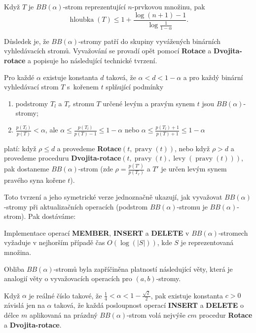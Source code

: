 \documentclass[a4paper,12pt]{article}
\DeclareMathOperator*{\levy}{levy}
\DeclareMathOperator*{\pravy}{pravy}
\DeclareMathOperator*{\hloubka}{hloubka}
\begin{document}
\begin{tvrzeni}Když $T$ je $BB(\alpha )$-strom reprezentující 
$n$-prvkovou množinu, pak 
$$\hloubka(T)\le 1+\frac {\log(n+1)-1}{\log\frac 1{1-\alpha}}.$$
\end{tvrzeni}

Důsledek je, že $BB(\alpha )$-stromy patří do 
skupiny vyvážených binárních vyhledávacích 
stro\-mů.  Vyvažování se provadí opět pomocí 
{\bf Rotace} a {\bf Dvojita-rotace} a popisuje ho následu\-jí\-cí 
technické tvrzení. 

\begin{tvrzeni}Pro každé $\alpha$ existuje konstanta $
d$ 
taková, že $\alpha <d<1-\alpha$ a pro každý binární vyhledávací 
strom $T$ s~kořenem $t$ splňující podmínky
\begin{enumerate}
\item
podstromy $T_l$ a $T_r$ stromu $T$ určené levým a pravým 
synem $t$ jsou $BB(\alpha )$-stromy;
\item
$\frac {p(T_l)}{p(T)}<\alpha$, ale $\alpha\le\frac {
p(T_l)}{p(T)-1}\le 1-\alpha$ nebo $\alpha\le\frac {
p(T_l)+1}{p(T)+1}\le 1-\alpha$
\end{enumerate}
platí:\newline 
když $\rho\le d$ a provedeme {\bf Rotace$(t,\pravy(t))$}, nebo když 
$\rho >d$ a provedeme proceduru {\bf Dvojita-rotace$(t,\pravy(t),\levy(\pravy(t)))$}, pak dostaneme 
$BB(\alpha )$-strom (zde $\rho =\frac {p(T')}{p(T_r
)}$ a $T'$ je určen levým synem 
pravé\-ho syna kořene $t$).  
\end{tvrzeni}

Toto tvrzení a jeho symetrické verze jednoznačně ukazují, 
jak vyvažovat $BB(\alpha )$-stromy při aktualizačních 
operacích (podstrom $BB(\alpha )$-stromu je $BB(\alpha )$-strom). Pak dostáváme:

\begin{veta}Implementace operací {\bf MEMBER}, {\bf INSERT} a {\bf DELETE }v $BB(\alpha )$-stromech vyžaduje v nejhorším 
případě čas $O(\log(|S|))$, kde $S$ je 
reprezentovaná množina.
\end{veta}

Obliba $BB(\alpha )$-stromů byla zapříčiněna 
platností následující věty, která je analogií věty o 
vyvažovacích operacích pro $(a,b)$-stromy.

\begin{veta}Když $\alpha$ je reálné číslo takové, že 
$\frac 14<\alpha <1-\frac {\sqrt 2}2$, pak existuje konstanta $c>
0$ závislá jen na 
$\alpha$ taková, že každá posloupnost operací {\bf INSERT} a {\bf DELETE }
o délce $m$ aplikovaná na prázdný $BB(\alpha )$-strom volá 
nejvýše $cm$ procedur {\bf Rotace} a {\bf Dvojita-rotace}.
\end{veta}
\end{document}
